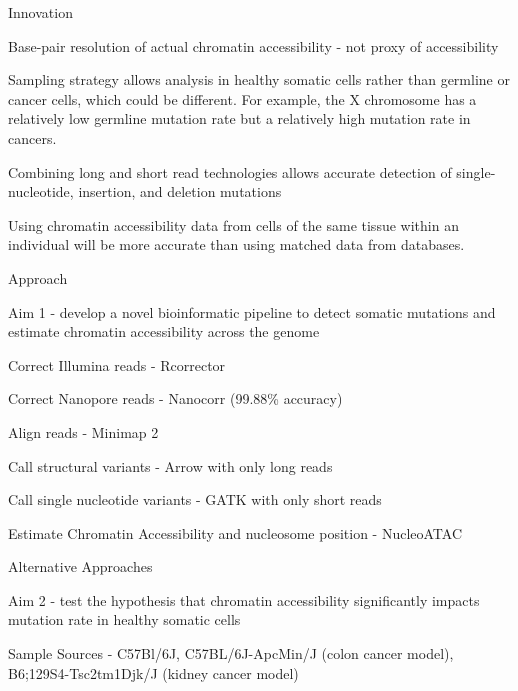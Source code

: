 \begin{outline}
\begin{outline}
\begin{outline}
		\end{outline}
	\end{outline}
	\item Innovation
	\begin{outline}
		\item Base-pair resolution of actual chromatin accessibility - not proxy of accessibility
		\item Sampling strategy allows analysis in healthy somatic cells rather than germline or cancer cells, which could be different. For example, the X chromosome has a relatively low germline mutation rate but a relatively high mutation rate in cancers. \parencite{makova_effects_2015}
		\item Combining long and short read technologies allows accurate detection of single-nucleotide, insertion, and deletion mutations
		\item Using chromatin accessibility data from cells of the same tissue within an individual will be more accurate than using matched data from databases.
	\end{outline}
	\item Approach
	\begin{outline}
		\item Aim 1 - develop a novel bioinformatic pipeline to detect somatic mutations and estimate chromatin accessibility across the genome
			\begin{outline}
				\item Correct Illumina reads - Rcorrector
				\item Correct Nanopore reads - Nanocorr (99.88\% accuracy) \parencite{goodwin_oxford_2015}
				\item Align reads - Minimap 2
				\item Call structural variants - Arrow with only long reads
				\item Call single nucleotide variants - GATK with only short reads
				\item Estimate Chromatin Accessibility and nucleosome position - NucleoATAC \parencite{schep_structured_2015} 
				\item Alternative Approaches
			\end{outline}
		\item Aim 2 - test the hypothesis that chromatin accessibility significantly impacts mutation rate in healthy somatic cells
			\begin{outline}
				\item Sample Sources - C57Bl/6J, C57BL/6J-ApcMin/J (colon cancer model), B6;129S4-Tsc2tm1Djk/J (kidney cancer model)

\end{outline}
\end{outline}
\end{outline}
